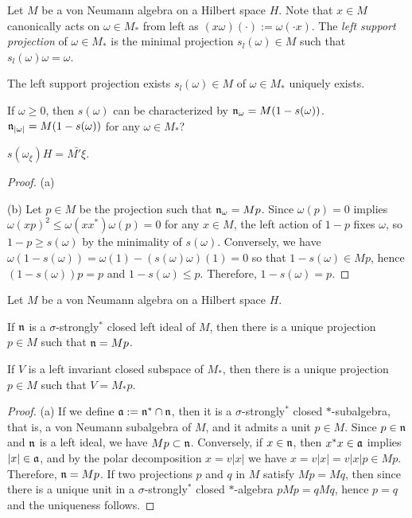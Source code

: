 \documentclass{../../large}
\begin{document}
\begin{prb}
Let $M$ be a von Neumann algebra on a Hilbert space $H$.
Note that $x\in M$ canonically acts on $\omega\in M_*$ from left as $(x\omega)(\cdot):=\omega(\cdot x)$.
The \emph{left support projection} of $\omega\in M_*$ is the minimal projection $s_l(\omega)\in M$ such that $s_l(\omega)\omega=\omega$.

\begin{parts}
\item The left support projection exists $s_l(\omega)\in M$ of $\omega\in M_*$ uniquely exists.
\item If $\omega\ge0$, then $s(\omega)$ can be characterized by $\mathfrak{n}_\omega=M(1-s(\omega))$. $\mathfrak{n}_{|\omega|}=M(1-s(\omega))$ for any $\omega\in M_*$?
\item $s(\omega_\xi)H=\bar{M'\xi}$.
\end{parts}
\end{prb}
\begin{proof}
(a)

(b)
Let $p\in M$ be the projection such that $\mathfrak{n}_\omega=Mp$.
Since $\omega(p)=0$ implies $\omega(xp)^2\le\omega(xx^*)\omega(p)=0$ for any $x\in M$, the left action of $1-p$ fixes $\omega$, so $1-p\ge s(\omega)$ by the minimality of $s(\omega)$.
Conversely, we have $\omega(1-s(\omega))=\omega(1)-(s(\omega)\omega)(1)=0$ so that $1-s(\omega)\in Mp$, hence $(1-s(\omega))p=p$ and $1-s(\omega)\le p$.
Therefore, $1-s(\omega)=p$.

\end{proof}


\begin{prb}
Let $M$ be a von Neumann algebra on a Hilbert space $H$.



\begin{parts}
\item If $\mathfrak{n}$ is a $\sigma$-strongly$^*$ closed left ideal of $M$, then there is a unique projection $p\in M$ such that $\mathfrak{n}=Mp$.
\item If $V$ is a left invariant closed subspace of $M_*$, then there is a unique projection $p\in M$ such that $V=M_*p$.
\end{parts}
\end{prb}
\begin{proof}
(a)
If we define $\mathfrak{a}:=\mathfrak{n}^*\cap\mathfrak{n}$, then it is a $\sigma$-strongly$^*$ closed $*$-subalgebra, that is, a von Neumann subalgebra of $M$, and it admits a unit $p\in M$.
Since $p\in\mathfrak{n}$ and $\mathfrak{n}$ is a left ideal, we have $Mp\subset\mathfrak{n}$.
Conversely, if $x\in\mathfrak{n}$, then $x^*x\in\mathfrak{a}$ implies $|x|\in\mathfrak{a}$, and by the polar decomposition $x=v|x|$ we have $x=v|x|=v|x|p\in Mp$.
Therefore, $\mathfrak{n}=Mp$.
If two projections $p$ and $q$ in $M$ satisfy $Mp=Mq$, then since there is a unique unit in a $\sigma$-strongly$^*$ closed $*$-algebra $pMp=qMq$, hence $p=q$ and the uniqueness follows.

\end{proof}
\end{document}
